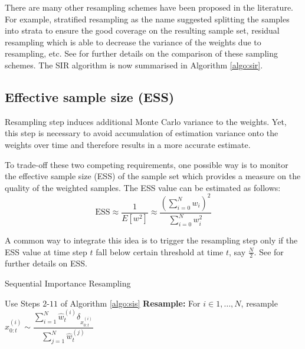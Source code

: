 There are many other resampling schemes have been proposed in the literature. For example, stratified resampling \cite{KG96} as the name suggested splitting the samples into strata to ensure the good coverage on the resulting sample set, residual resampling \cite{JSL98} which is able to decrease the variance of the weights due to resampling, etc. See \cite{DR05} for further details on the comparison of these sampling schemes.  The SIR algorithm is now summarised in Algorithm \ref{algo:sir}.

\subsection{Effective sample size (ESS)}
\label{sec:ess}
Resampling step induces additional Monte Carlo variance to the weights. Yet, this step is necessary to avoid accumulation of estimation variance onto the weights over time and therefore results in a more accurate estimate.

To trade-off these two competing requirements, one possible way is to monitor the effective sample size (ESS) of the sample set which provides a measure on the quality of the weighted samples. The ESS value can be estimated as follows:
\begin{equation}
  \text{ESS} \approx \dfrac{1}{E[w^2]} \approx \dfrac{\left(\sum^N_{i=0} w_i \right)^2}{\sum^N_{i=0}w_i^2}
\end{equation}

A common way to integrate this idea is to trigger the resampling step only if the ESS value at time step $t$ fall below certain threshold at time $t$, say $\frac{N}{2}$. See \cite{JAM10} for further details on ESS.

\begin{algorithm}
\caption{Sequential Importance Resampling}\label{algo:sir}
\begin{algorithmic}[1]
\State Use Steps $2$-$11$ of Algorithm \ref{algo:sis}
\State \textbf{Resample:} For $i \in 1, \ldots, N$, resample $ x^{(i)}_{0:t} \sim \dfrac{\sum^N_{i=1}\hat{w}^{(i)}_t\delta_{x^{(i)}_{0:t}}}{\sum^N_{j=1} \hat{w}^{(j)}_t}$
\EndFunction
\end{algorithmic}
\end{algorithm}

